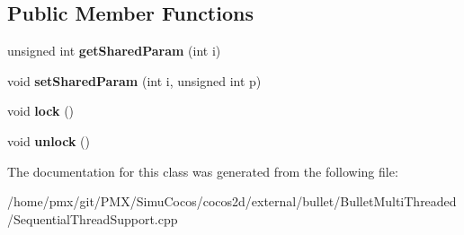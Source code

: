 \subsection*{Public Member Functions}
\begin{DoxyCompactItemize}
\item 
\mbox{\label{classbtDummyCriticalSection_adf954732171d1a3d6fe984a47c13bf65}} 
unsigned int {\bfseries get\+Shared\+Param} (int i)
\item 
\mbox{\label{classbtDummyCriticalSection_aa4630ed1f2cd498b273b01ac0169600d}} 
void {\bfseries set\+Shared\+Param} (int i, unsigned int p)
\item 
\mbox{\label{classbtDummyCriticalSection_ae62728d00d0d78f33f513463a72a6432}} 
void {\bfseries lock} ()
\item 
\mbox{\label{classbtDummyCriticalSection_a1d262d8244f3040e06ac904a30b6553c}} 
void {\bfseries unlock} ()
\end{DoxyCompactItemize}


The documentation for this class was generated from the following file\+:\begin{DoxyCompactItemize}
\item 
/home/pmx/git/\+P\+M\+X/\+Simu\+Cocos/cocos2d/external/bullet/\+Bullet\+Multi\+Threaded/Sequential\+Thread\+Support.\+cpp\end{DoxyCompactItemize}
